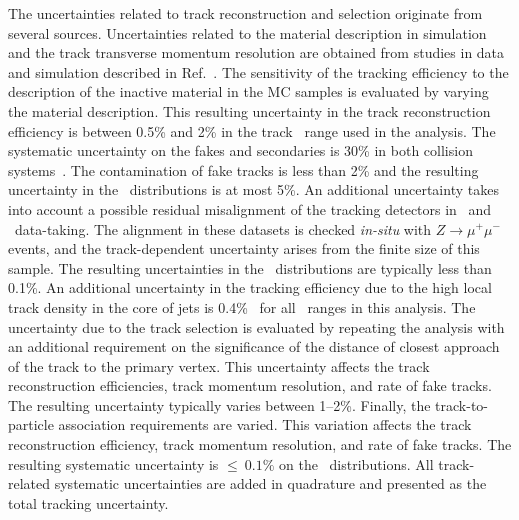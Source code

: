 The uncertainties related to track reconstruction and selection originate from several sources.
Uncertainties related to the material description in simulation and the track transverse 
momentum resolution are obtained from studies in data and simulation described in Ref.~\cite{ATL-PHYS-PUB-2015-051}.
The sensitivity of the tracking efficiency to the description of the 
inactive material in the MC samples is evaluated by varying the material description.
This resulting uncertainty in the track reconstruction efficiency is between
0.5\% and 2\% in the track \pT\ range used in the analysis. 
The systematic uncertainty on the fakes and secondaries is 30\% in both collision systems~\cite{ATL-PHYS-PUB-2015-051}.  The contamination of fake tracks is less than 2\% and the resulting uncertainty in the \Dptr\ distributions is at most 5\%.
An additional uncertainty takes into account a possible residual misalignment of the tracking detectors
in \pp\ and \PbPb\ data-taking. The alignment in these datasets is checked \textit{in-situ} with $Z\rightarrow \mu^{+}\mu^{-}$ events, and the track-\pT\-dependent uncertainty arises from the finite size of this sample. The resulting uncertainties in
the \Dptr\ distributions are typically less than 0.1\%. An additional  uncertainty in the tracking efficiency due to the high local track density in the core of jets is 0.4\%~\cite{ATL-PHYS-PUB-2016-007} for all \ptjet\ ranges in this analysis. The uncertainty due to the track selection is evaluated by repeating the analysis with an additional requirement on the significance of the distance of closest approach of the track to the primary vertex. This uncertainty affects 
the track reconstruction efficiencies, track momentum resolution, and rate of fake tracks. The resulting uncertainty typically varies between 1--2\%.
Finally, the track-to-particle association requirements are varied. This variation affects the track reconstruction efficiency, track momentum resolution, and rate of fake tracks. The resulting systematic uncertainty is $\leq~0.1 \%$ on the \Dptr\ distributions. All track-related systematic uncertainties are added in quadrature and presented as the total tracking uncertainty. 

